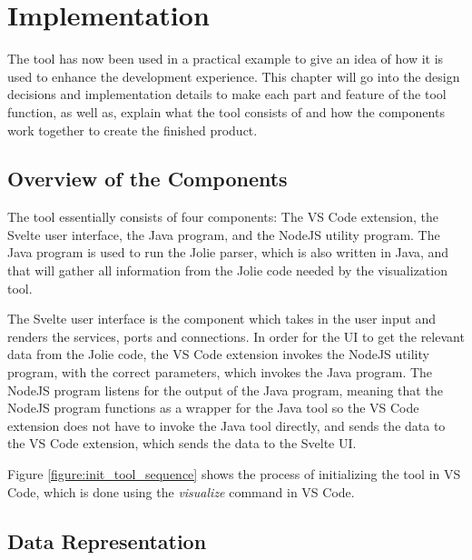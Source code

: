 \chapter{Implementation}
The tool has now been used in a practical example to give an idea of how it is used to enhance the development experience.
This chapter will go into the design decisions and implementation details to make each part and feature of the tool function, as well as,
explain what the tool consists of and how the components work together to create the finished product.

\section{Overview of the Components}
The tool essentially consists of four components: The VS Code extension, the Svelte user interface, the Java program, and the NodeJS utility program.
The Java program is used to run the Jolie parser, which is also written in Java, and that will gather all information from the Jolie code needed by the visualization tool.

The Svelte user interface is the component which takes in the user input and renders the services, ports and connections.
In order for the UI to get the relevant data from the Jolie code, the VS Code extension invokes the NodeJS utility program, with the correct parameters, which invokes the Java program. 
The NodeJS program listens for the output of the Java program,
meaning that the NodeJS program functions as a wrapper for the Java tool so the VS Code extension does not have to invoke the Java tool directly,
and sends the data to the VS Code extension, which sends the data to the Svelte UI.

Figure \ref*{figure:init_tool_sequence} shows the process of initializing the tool in VS Code, which is done using the \textit{visualize} command in VS Code.

\clearpage
\section{Data Representation}


